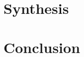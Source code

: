 \documentclass{beamer}
\begin{document}
  \section{Synthesis}
  \begin{frame}
  \end{frame}

  \begin{frame}
  \end{frame}

  \section{Conclusion}
  \begin{frame}
  \end{frame}

  \begin{frame}
  \end{frame}
\end{document}
